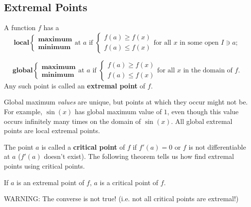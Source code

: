 



\subsection{Extremal Points}

\noindent A function $f$ has a
$$\textbf{local} \begin{cases}\textbf{maximum}\\\textbf{minimum}\end{cases}\text{at }a \text{ if }\begin{cases}f(a)\geq f(x)\\f(a)\leq f(x)\end{cases} \text{for all $x$ in some open $I\ni a$};$$

$$\textbf{global} \begin{cases}\textbf{maximum}\\\textbf{minimum}\end{cases}\text{at }a \text{ if }\begin{cases}f(a)\geq f(x)\\f(a)\leq f(x)\end{cases} \text{for all $x$ in the domain of $f$}.$$
Any such point is called an \textbf{extremal point} of $f$.

Global maximum \textit{values} are unique, but points at which they occur might not be. For example, $\sin(x)$ has global maximum value of $1$, even though this value occurs infinitely many times on the domain of $\sin(x)$. All global extremal points are local extremal points.


The point $a$ is called a \textbf{critical point} of $f$ if $f'(a)=0$ or $f$ is not differentiable at $a$ ($f'(a)$ doesn't exist). The following theorem tells us how find extremal points using critical points.

\begin{thm}
If $a$ is an extremal point of $f$, $a$ is a critical point of $f$.
\end{thm}

\noindent WARNING: The converse is not true! (i.e. not all critical points are extremal!)

